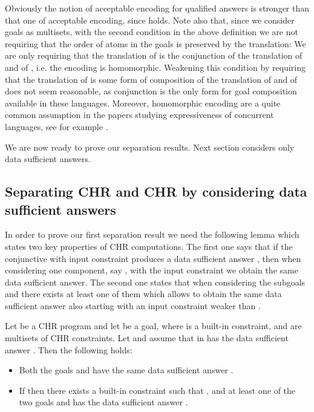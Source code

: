 Obviously the notion of acceptable encoding for qualified answers is stronger than that one of acceptable encoding, since   holds.
Note also that, since we consider goals as multisets, with the second condition in the above definition we are not requiring that the order of atoms in the goals is preserved by the translation: We are only requiring that
the translation of  is the conjunction of the translation of  and of , i.e. the encoding is homomorphic.
Weakening this condition by requiring that the translation of  is some form of composition of the translation of  and of  does not seem reasonable, as conjunction is the only form for goal composition available in these languages.
Moreover, homomorphic encoding are a quite common assumption in the papers studying expressiveness of concurrent languages, see for example \cite{Pal03}.

We are now ready to prove our separation results. Next section considers only data sufficient answers.







\subsection{Separating CHR and CHR by considering data sufficient answers}

In order to prove our first separation result we need the following lemma which states two key properties of CHR computations.
The first one says that if the conjunctive  with input constraint  produces a data sufficient answer , then when considering one component, say , with the input constraint 
we obtain the same data sufficient answer.  The second one states that when considering the subgoals  and  there exists at least one of them which allows to obtain the same data sufficient answer  also starting with an input constraint  weaker than .





\begin{lemma}\label{lem:preservarisposte}
 Let  be a CHR program  and let  be a goal, where  is a built-in constraint,  and  are multisets of CHR constraints. Let  and assume that  in  has the data sufficient answer .
Then the following holds:
\begin{itemize}
\item
Both the goals   and
 have the same data sufficient answer .
\item If  then there exists a built-in constraint  such that ,  and
at least one of the two goals   and  has the data sufficient answer .
\end{itemize}

\end{lemma}


